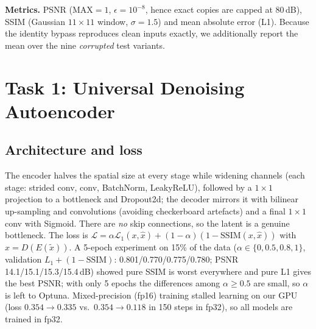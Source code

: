 \documentclass[conference]{IEEEtran}
\begin{document}
\textbf{Metrics.} PSNR ($\mathrm{MAX}=1$, $\epsilon=10^{-8}$, hence exact copies are capped at 80\,dB), SSIM (Gaussian $11\times11$ window, $\sigma=1.5$) and mean absolute error (L1). Because the identity bypass reproduces clean inputs exactly, we additionally report the mean over the nine \emph{corrupted} test variants.

\section{Task 1: Universal Denoising Autoencoder}
\subsection{Architecture and loss}
The encoder halves the spatial size at every stage while widening channels (each stage: strided conv, conv, BatchNorm, LeakyReLU), followed by a $1\times1$ projection to a bottleneck and Dropout2d; the decoder mirrors it with bilinear up-sampling and convolutions (avoiding checkerboard artefacts) and a final $1\times1$ conv with Sigmoid. There are \emph{no} skip connections, so the latent is a genuine bottleneck. The loss is $\mathcal{L}=\alpha\mathcal{L}_1(x,\hat x)+(1-\alpha)(1-\mathrm{SSIM}(x,\hat x))$ with $\hat x=D(E(\tilde x))$. A 5-epoch experiment on 15\% of the data ($\alpha\in\{0,0.5,0.8,1\}$, validation $L_1+(1-\mathrm{SSIM})$: 0.801/0.770/0.775/0.780; PSNR 14.1/15.1/15.3/15.4\,dB) showed pure SSIM is worst everywhere and pure L1 gives the best PSNR; with only 5 epochs the differences among $\alpha\ge0.5$ are small, so $\alpha$ is left to Optuna. Mixed-precision (fp16) training stalled learning on our GPU (loss $0.354\to0.335$ vs.\ $0.354\to0.118$ in 150 steps in fp32), so all models are trained in fp32.
\end{document}

